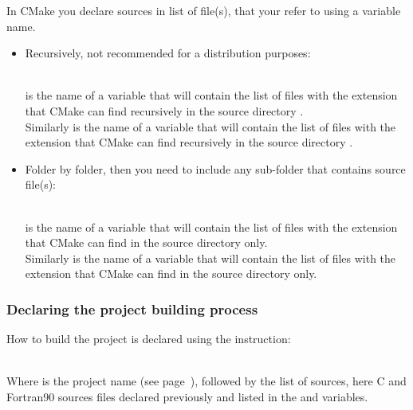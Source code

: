 In CMake you declare sources in list of file(s), that your refer to using a variable name.
\begin{itemize}
\item Recursively, not recommended for a distribution purposes:
{\footnotesize{
\begin{scripti}
\end{scripti}
}} \\[-0.5cm]
\noindent {} is the name of a variable that will contain the list of files with the extension \texttt{} that CMake can find recursively in the source directory \texttt{}. \\
Similarly  is the name of a variable that will contain the list of files with the extension \texttt{} that CMake can find recursively in the source directory \texttt{}.
\item Folder by folder, then you need to include any sub-folder that contains source file(s):
{\footnotesize{
\begin{scripti}
\end{scripti}
}} \\[-0.5cm]
\noindent {} is the name of a variable that will contain the list of files with the extension \texttt{} that CMake can find in the source directory \texttt{} only. \\
Similarly  is the name of a variable that will contain the list of files with the extension \texttt{} that CMake can find in the source directory \texttt{} only. 
\end{itemize}

\newpage
\subsubsection*{Declaring the project building process}

How to build the project is declared using the  instruction:
\begin{script}
\end{script}
\\[-0.25cm]
\noindent Where  is the project name (see page~\pageref{cmake_pname}), followed by the list of sources, here C and Fortran90 sources files declared previously and listed in the  and  variables. 

